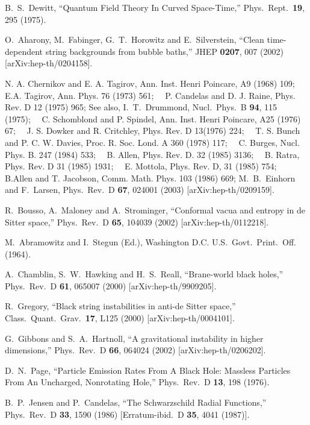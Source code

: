\documentclass[a4paper,aps,prd,preprintnumbers,groupedaddress]{revtex4}
\begin{document}
\begin{references}
 B.~S.~Dewitt,
``Quantum Field Theory In Curved Space-Time,'' Phys.\ Rept.\  {\bf 19}, 295 (1975).

O.~Aharony, M.~Fabinger, G.~T.~Horowitz and E.~Silverstein,
``Clean time-dependent string backgrounds from bubble baths,''
JHEP {\bf 0207}, 007 (2002)
[arXiv:hep-th/0204158].

{N. A. Chernikov and E. A. Tagirov, Ann. Inst. Henri Poincare,
A9 (1968) 109;~~
E.A. Tagirov, Ann. Phys. 76 (1973) 561;~~
P. Candelas and D. J. Raine, Phys.  Rev.  D 12 (1975) 965;
See also, I.~T.~Drummond,
Nucl.\ Phys.\ B {\bf 94}, 115 (1975);~~
C. Schomblond and P. Spindel, Ann. Inst. Henri Poincare, A25 (1976) 67;~~
J. S. Dowker and R. Critchley, Phys.  Rev.  D 13(1976) 224;~~
T. S. Bunch and P. C. W. Davies, Proc.  R. Soc.  Lond.
A 360 (1978) 117;~~
C. Burges, Nucl.  Phys.  B. 247 (1984) 533;~~
B. Allen, Phys.  Rev.  D. 32 (1985) 3136;~~
B. Ratra, Phys.  Rev. D 31 (1985) 1931;~~
E. Mottola, Phys. Rev. D, 31 (1985) 754;~~
B.Allen and T. Jacobson, Comm.  Math.  Phys.  103 (1986) 669;
M.~B.~Einhorn and F.~Larsen,
Phys.\ Rev.\ D {\bf 67}, 024001 (2003)
[arXiv:hep-th/0209159].}

 R.~Bousso, A.~Maloney and A.~Strominger,
``Conformal vacua and entropy in de Sitter space,'' Phys.\ Rev.\ D {\bf 65}, 104039 (2002) [arXiv:hep-th/0112218].


 {M.\ Abramowitz and I.\ Stegun (Ed.), Washington D.C.\: U.S.\ Govt.\ Print.\ Off.\, (1964).}

 A.~Chamblin, S.~W.~Hawking and H.~S.~Reall,
``Brane-world black holes,'' Phys.\ Rev.\ D {\bf 61}, 065007 (2000) [arXiv:hep-th/9909205].


 R.~Gregory,
``Black string instabilities in anti-de Sitter space,'' Class.\ Quant.\ Grav.\  {\bf 17}, L125 (2000) [arXiv:hep-th/0004101].


 G.~Gibbons and S.~A.~Hartnoll,
``A gravitational instability in higher dimensions,'' Phys.\ Rev.\ D {\bf 66}, 064024 (2002) [arXiv:hep-th/0206202].


 D.~N.~Page,
``Particle Emission Rates From A Black Hole: Massless Particles From An Uncharged, Nonrotating Hole,'' Phys.\ Rev.\ D {\bf 13}, 198 (1976).

 B.~P.~Jensen and P.~Candelas,
``The Schwarzschild Radial Functions,'' Phys.\ Rev.\ D {\bf 33}, 1590 (1986) [Erratum-ibid.\ D {\bf 35}, 4041 (1987)].


\end{references}
\end{document}
